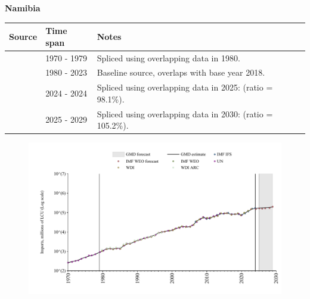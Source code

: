 \documentclass[12pt,a4paper,landscape]{article}
\begin{document}
\begin{adjustbox}{max totalsize={\paperwidth}{\paperheight},center}
\begin{minipage}[t][\textheight][t]{\textwidth}
\vspace*{0.5cm}
{}
\begin{center}
{\Large\bfseries Namibia}
\end{center}
\vspace{0.5cm}
\begin{table}[H]
\centering
\small
\begin{tabular}{|l|l|l|}
\hline
\textbf{Source} & \textbf{Time span} & \textbf{Notes} \\
\hline
\rowcolor{white}\cite{UN}& 1970 - 1979 &Spliced using overlapping data in 1980.\\
\rowcolor{lightgray}\cite{WDI}& 1980 - 2023 &Baseline source, overlaps with base year 2018.\\
\rowcolor{white}\cite{IMF_IFS}& 2024 - 2024 &Spliced using overlapping data in 2025: (ratio = 98.1\%).\\
\rowcolor{lightgray}\cite{IMF_WEO_forecast}& 2025 - 2029 &Spliced using overlapping data in 2030: (ratio = 105.2\%).\\
\hline
\end{tabular}
\end{table}
\begin{figure}[H]
\centering
\includegraphics[width=\textwidth,height=0.6\textheight,keepaspectratio]{graphs/NAM_imports.pdf}
\end{figure}
\end{minipage}
\end{adjustbox}
\end{document}

